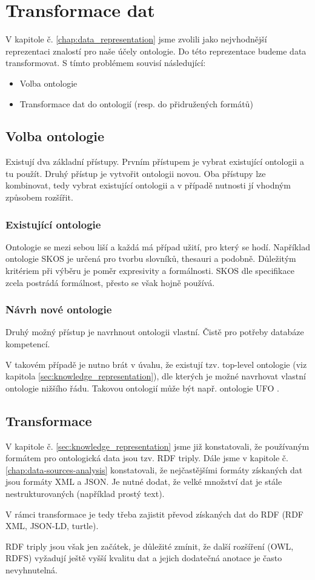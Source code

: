 \section{Transformace dat}
V kapitole č. \ref{chap:data_representation} jsme zvolili jako nejvhodnější reprezentaci znalostí pro naše účely ontologie. Do této reprezentace budeme data transformovat. S tímto problémem souvisí následující:
\begin{itemize}
    \item Volba ontologie
    \item Transformace dat do ontologií (resp. do přidružených formátů)
\end{itemize}
\subsection{Volba ontologie}
Existují dva základní přístupy. Prvním přístupem je vybrat existující ontologii a tu použít. Druhý přístup je vytvořit ontologii novou. Oba přístupy lze kombinovat, tedy vybrat existující ontologii a v případě nutnosti jí vhodným způsobem rozšířit.\par
\subsubsection{Existující ontologie}
Ontologie se mezi sebou liší a každá má případ užití, pro který se hodí. Například ontologie SKOS je určená pro tvorbu slovníků, thesauri a podobně. Důležitým kritériem při výběru je poměr expresivity a formálnosti. SKOS dle specifikace \cite{SKOS} zcela postrádá formálnost, přesto se však hojně používá.\par
\subsubsection{Návrh nové ontologie}
Druhý možný přístup je navrhnout ontologii vlastní. Čistě pro potřeby databáze kompetencí.\par
V takovém případě je nutno brát v úvahu, že existují tzv. top-level ontologie (viz kapitola \ref{sec:knowledge_representation}), dle kterých je možné navrhovat vlastní ontologie nižšího řádu. Takovou ontologií může být např. ontologie UFO \cite{Guizzardi2005}.

\subsection{Transformace}
V kapitole č. \ref{sec:knowledge_representation} jsme již konstatovali, že používaným formátem pro ontologická data jsou tzv. RDF triply. Dále jsme v kapitole č. \ref{chap:data-sources-analysis} konstatovali, že nejčastějšími formáty získaných dat jsou formáty XML a JSON. Je nutné dodat, že velké množství dat je stále nestrukturovaných (například prostý text).\par
V rámci transformace je tedy třeba zajistit převod získaných dat do RDF (RDF XML, JSON-LD, turtle).\par
RDF triply jsou však jen začátek, je důležité zmínit, že další rozšíření (OWL, RDFS) vyžadují ještě vyšší kvalitu dat a jejich dodatečná anotace je často nevyhnutelná.
